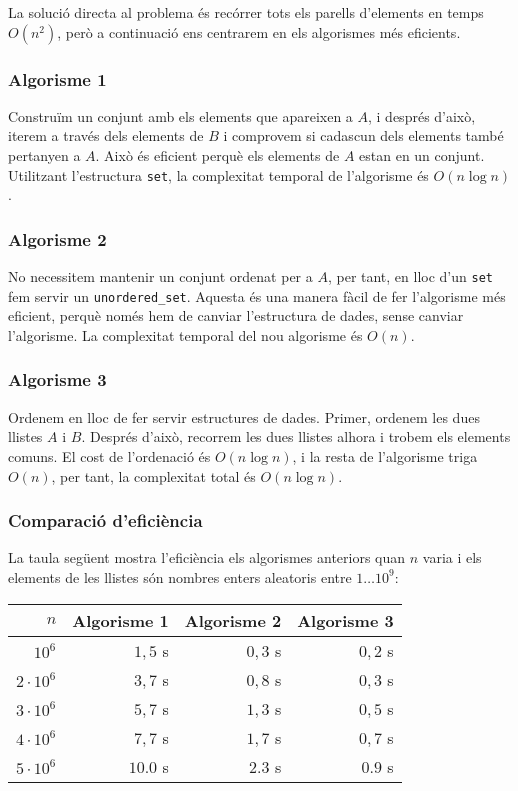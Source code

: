 La solució directa al problema és
recórrer tots els parells d'elements en temps $O(n^2)$,
però a continuació ens centrarem
en els algorismes més eficients.

\subsubsection{Algorisme 1}

Construïm un conjunt amb els elements que apareixen a $A$,
i després d'això, iterem a través dels elements
de $B$ i comprovem si cadascun dels elements també
pertanyen a $A$.
Això és eficient perquè els elements de $A$
estan en un conjunt.
Utilitzant l'estructura \texttt{set},
la complexitat temporal de l'algorisme és $O(n \log n)$.

\subsubsection{Algorisme 2}

No necessitem mantenir un conjunt ordenat per a $A$,
per tant, en lloc d'un \texttt{set}
fem servir un \texttt{unordered\_set}.
Aquesta és una manera fàcil de fer l'algorisme
més eficient, perquè només hem de canviar
l'estructura de dades, sense canviar l'algorisme.
La complexitat temporal del nou algorisme és $O(n)$.

\subsubsection{Algorisme 3}

Ordenem en lloc de fer servir estructures de dades.
Primer, ordenem les dues llistes $A$ i $B$.
Després d'això, recorrem les dues llistes
alhora i trobem els elements comuns.
El cost de l'ordenació és $O(n \log n)$,
i la resta de l'algorisme triga $O(n)$,
per tant, la complexitat total és $O(n \log n)$.

\subsubsection{Comparació d'eficiència}

La taula següent mostra l'eficiència
els algorismes anteriors quan $n$ varia i
els elements de les llistes són nombres enters
aleatoris entre $1 \ldots 10^9$:

\begin{center}
\begin{tabular}{rrrr} 
$n$ & Algorisme 1 & Algorisme 2 & Algorisme 3 \\
\hline
$10^6$ & $1,5$ s & $0,3$ s & $0,2$ s \\
$2 \cdot 10^6$ & $3,7$ s & $0,8$ s & $0,3$ s \\
$3 \cdot 10^6$ & $5,7$ s & $1,3$ s & $0,5$ s \\
$4 \cdot 10^6$ & $7,7$ s & $1,7$ s & $0,7$ s \\
$5 \cdot 10^6$ & $10.0$ s & $2.3$ s & $0.9$ s \\
\end{tabular}
\end{center}

